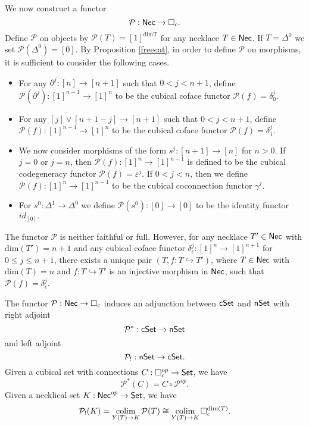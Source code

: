 We now construct a functor
$$\mathcal{P}: \mathsf{Nec} \to \square_c.$$
Define $\mathcal{P}$ on objects by $\mathcal{P}( T )= [1]^{\text{dim{T}}}$ for any necklace $T \in \mathsf{Nec}$. If $T= \Delta^0$ we set $\mathcal{P}(\Delta^0)=[0].$ By Proposition \ref{freecat}, in order to define $\mathcal{P}$ on morphisms, it is sufficient to consider the following cases.
\begin{itemize}
\item For any $\partial^j: [n] \to [n+1]$ such that $0< j<{n+1}$, define $\mathcal{P}(\partial^j): [1]^{n-1}\to [1]^{n}$ to be the cubical coface functor $\mathcal{P}(f)= \delta_0^{j}.$ 

\item For any $[j] \vee [n+1-j] \to [n+1]$ such that $0<j<n+1$, define $\mathcal{P}(f): [1]^{n-1}\to [1]^{n}$ to be the cubical coface functor $\mathcal{P}(f)=\delta_1^{j}$.

\item We now consider morphisms of the form $s^j: [n+1] \to [n]$ for $n>0$. If $j=0$ or $j=n$, then $\mathcal{P}(f): [1]^n \to [1]^{n-1}$ is defined to be the cubical codegeneracy functor $\mathcal{P}(f)= \varepsilon^{j}.$ If $0<j<n$, then we define $\mathcal{P}(f): [1]^n \to [1]^{n-1}$ to be the cubical coconnection functor $\gamma^{j}.$

\item For $s^0: \Delta^1 \to \Delta^0$ we define $\mathcal{P}(s^0): [0] \to [0]$ to be the identity functor $id_{[0]}.$

\end{itemize}
\begin{remark}
The functor $\mathcal{P}$ is neither faithful or full. However, for any necklace $T' \in \mathsf{Nec}$ with $\text{dim}(T')=n+1$ and any cubical coface functor $\delta_{\epsilon}^j: [1]^n \to [1]^{n+1}$ for $0 \leq j \leq n+1$, there exists a unique pair $(T, f: T \hookrightarrow T')$, where $T \in \mathsf{Nec}$ with $\text{dim}(T)=n$ and $f: T \hookrightarrow T'$ is an injective morphism in $\mathsf{Nec}$, such that $\mathcal{P}(f)=\delta_{\epsilon}^j $.
\end{remark}

The functor $\mathcal{P}: \mathsf{Nec} \to \square_c$ induces an adjunction between $\mathsf{cSet}$ and $\mathsf{nSet}$
with right adjoint
$$\mathcal{P}^*: \mathsf{cSet} \to \mathsf{nSet}$$
and left adjoint
$$\mathcal{P}_{!} : \mathsf{nSet} \to \mathsf{cSet}.$$
Given a cubical set with connections $C: \square_c^{op} \to \mathsf{Set}$, we have $$\mathcal{P}^*(C)= C \circ \mathcal{P}^{op}.$$ Given a necklical set $K: \mathsf{Nec}^{op} \to \mathsf{Set}$, we have $$\mathcal{P}_{!}(K)= \operatorname*{colim}_{Y(T) \to K} \mathcal{P}(T) \cong \operatorname*{colim}_{Y(T) \to K} \square_c^{\text{dim}(T)}.$$
